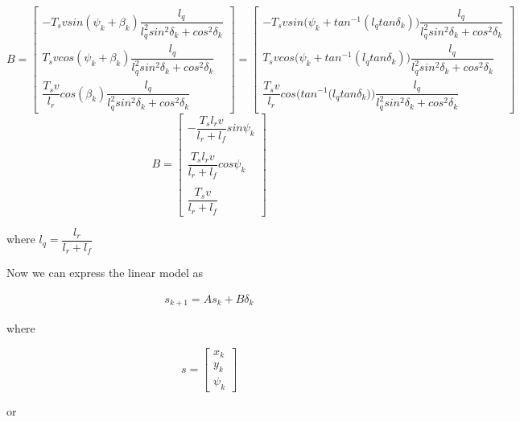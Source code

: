 \begin{equation}
 B =
  \begin{bmatrix}
    -T_s v sin(\psi_k + \beta_k) \dfrac{l_q}{l_q^2 sin^2\delta_k + cos^2\delta_k} \\
    T_s v cos(\psi_k + \beta_k) \dfrac{l_q}{l_q^2 sin^2\delta_k + cos^2\delta_k} \\
    \dfrac{T_s v}{l_r} cos(\beta_k) \dfrac{l_q}{l_q^2 sin^2\delta_k + cos^2\delta_k}
  \end{bmatrix}
  =
  \begin{bmatrix}
    -T_s v sin\Big(\psi_k + tan^{-1} (l_q tan\delta_k)\Big) \dfrac{l_q}{l_q^2 sin^2\delta_k + cos^2\delta_k} \\
    T_s v cos\Big(\psi_k + tan^{-1} (l_q tan\delta_k)\Big) \dfrac{l_q}{l_q^2 sin^2\delta_k + cos^2\delta_k} \\
    \dfrac{T_s v}{l_r} cos\Bigg(tan^{-1} \Big(l_q tan\delta_k\Big)\Bigg) \dfrac{l_q}{l_q^2 sin^2\delta_k + cos^2\delta_k}
  \end{bmatrix}
\end{equation}
\begin{equation}
 B =
  \begin{bmatrix}
    -\dfrac{T_s l_r v}{l_r + l_f} sin\psi_k \\\\
    \dfrac{T_s l_r v}{l_r + l_f} cos\psi_k \\\\
    \dfrac{T_s v}{l_r+l_f}
  \end{bmatrix}
\end{equation}

where $l_q = \dfrac{l_r}{l_r + l_f}$




Now we can express the linear model as

\begin{align}
  s_{k+1} = A s_k + B \delta_k
\end{align}

where

\begin{equation}
  s=
  \begin{bmatrix}
    x_{k} \\
    y_{k} \\
    \psi_{k}
  \end{bmatrix}
\end{equation}

or

